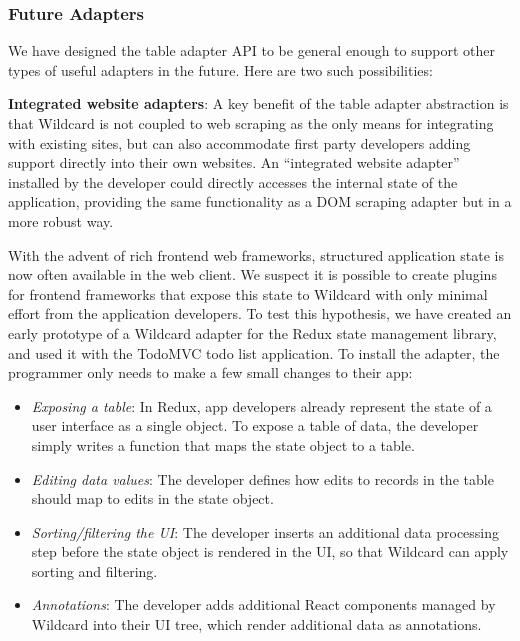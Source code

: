 \documentclass[sigplan,screen,10pt,anonymous,review]{acmart}
\providecommand{\tightlist}{%
  \setlength{\itemsep}{0pt}\setlength{\parskip}{0pt}}
\begin{document}
\hypertarget{future-adapters}{%
\subsubsection{Future Adapters}\label{future-adapters}}

We have designed the table adapter API to be general enough to support
other types of useful adapters in the future. Here are two such
possibilities:

\textbf{Integrated website adapters}: A key benefit of the table adapter
abstraction is that Wildcard is not coupled to web scraping as the only
means for integrating with existing sites, but can also accommodate
first party developers adding support directly into their own websites.
An ``integrated website adapter'' installed by the developer could
directly accesses the internal state of the application, providing the
same functionality as a DOM scraping adapter but in a more robust way.

With the advent of rich frontend web frameworks, structured application
state is now often available in the web client. We suspect it is
possible to create plugins for frontend frameworks that expose this
state to Wildcard with only minimal effort from the application
developers. To test this hypothesis, we have created an early prototype
of a Wildcard adapter for the Redux state management library, and used
it with the TodoMVC todo list application. To install the adapter, the
programmer only needs to make a few small changes to their app:

\begin{itemize}
\tightlist
\item
  \emph{Exposing a table}: In Redux, app developers already represent
  the state of a user interface as a single object. To expose a table of
  data, the developer simply writes a function that maps the state
  object to a table.
\item
  \emph{Editing data values}: The developer defines how edits to records
  in the table should map to edits in the state object.
\item
  \emph{Sorting/filtering the UI}: The developer inserts an additional
  data processing step before the state object is rendered in the UI, so
  that Wildcard can apply sorting and filtering.
\item
  \emph{Annotations}: The developer adds additional React components
  managed by Wildcard into their UI tree, which render additional data
  as annotations.
\end{itemize}
\end{document}
